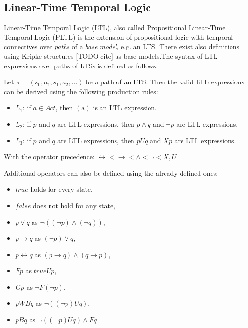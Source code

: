 \subsection{Linear-Time Temporal Logic} \label{subs_backgrltl}
Linear-Time Temporal Logic (LTL), also called Propositional Linear-Time Temporal Logic (PLTL) is the extension of propositional logic with temporal connectives over \textit{paths} of a \textit{base model}, e.g. an LTS. There exist also definitions using Kripke-structures [TODO cite] as base models.The syntax of LTL expressions over paths of LTSs is defined as follows:

\begin{definition}
	Let $\pi = (s_0, a_1, s_1, a_2, ... )$ be a path of an LTS. Then the valid LTL expressions can be derived using the following production rules:
	\begin{itemize}
		\item $L_1$: if $a \in Act$, then $(a)$ is an LTL expression. 
		\item $L_2$: if $p$ and $q$ are LTL expressions, then $p \land q$ and $\neg p$ are LTL expressions.
		\item $L_3$: if $p$ and $q$ are LTL expressions, then $p U q$ and $X p$ are LTL expressions.
	\end{itemize}
	With the operator precedence: $\leftrightarrow  <  \rightarrow  < \land  <  \neg  <  X, U$
\end{definition}

Additional operators can also be defined using the already defined ones:
\begin{itemize}
	\setlength\itemsep{0.2em}
	\item $true$ holds for every state,
	\item $false$ does not hold for any state,  
	\item $p \lor q$ as $\neg((\neg p) \land (\neg q))$,
	\item $p \rightarrow q$ as $(\neg p) \lor q$,
	\item $p \leftrightarrow q$ as $(p \rightarrow q) \land (q \rightarrow p)$,
	\item $F p$ as $true U p$,
	\item $G p$ as $\neg F(\neg p)$,
	\item $p WB q$ as $\neg((\neg p) U q)$,
	\item $p B q$ as $\neg((\neg p) U q) \land F q$
\end{itemize}

